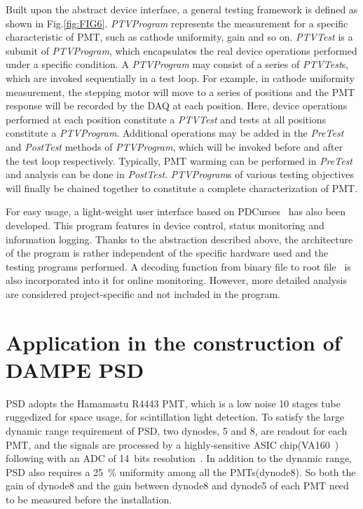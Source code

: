\documentclass[preprint, times]{elsarticle}
\begin{document}
Built upon the abstract device interface, a general testing framework is defined as shown in Fig.\ref{fig:FIG6}.
\textit{PTVProgram} represents the measurement for a specific characteristic of PMT, such as cathode uniformity, gain and so on.
\textit{PTVTest} is a subunit of \textit{PTVProgram}, which encapsulates the real device operations performed under a specific condition.
A \textit{PTVProgram} may consist of a series of \textit{PTVTest}s, which are invoked sequentially in a test loop.
For example, in cathode uniformity measurement, the stepping motor will move to a series of positions and the PMT response will be recorded by the DAQ at each position.
Here, device operations performed at each position constitute a \textit{PTVTest} and tests at all positions constitute a \textit{PTVProgram}.
Additional operations may be added in the \textit{PreTest} and \textit{PostTest} methods of \textit{PTVProgram}, which will be invoked before and after the test loop respectively.
Typically, PMT warming can be performed in \textit{PreTest} and analysis can be done in \textit{PostTest}.
\textit{PTVProgram}s of various testing objectives will finally be chained together to constitute a complete characterization of PMT.

For easy usage, a light-weight user interface based on PDCurses~\cite{pdcurses} has also been developed.
This program features in device control, status monitoring and information logging.
Thanks to the abstraction described above, the architecture of the program is rather independent of the specific hardware used and the testing programs performed.
A decoding function from binary file to root file~\cite{root} is also incorporated into it for online monitoring.
However, more detailed analysis are considered project-specific and not included in the program. 

\section{Application in the construction of DAMPE PSD}
\label{sec:application}

PSD adopts the Hamamastu R4443 PMT, which is a low noise 10 stages tube ruggedized for space usage, for scintillation light detection.
To satisfy the large dynamic range requirement of PSD, two dynodes, 5 and 8, are readout for each PMT, 
and the signals are processed by a highly-sensitive ASIC chip(VA160~\cite{va160}) following with an ADC of 14~bits resolution~\cite{fee}. 
In addition to the dynamic range, PSD also requires a \SI{25}{\percent} uniformity among all the PMTs(dynode8). 
So both the gain of dynode8 and the gain between dynode8 and dynode5 of each PMT need to be measured before the installation.
\end{document}
